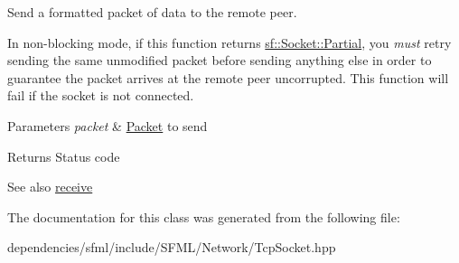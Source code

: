 Send a formatted packet of data to the remote peer. 

In non-\/blocking mode, if this function returns \hyperlink{classsf_1_1_socket_a51bf0fd51057b98a10fbb866246176dca181c163fad2eaea927185d127c392706}{sf\+::\+Socket\+::\+Partial}, you {\itshape must} retry sending the same unmodified packet before sending anything else in order to guarantee the packet arrives at the remote peer uncorrupted. This function will fail if the socket is not connected.


\begin{DoxyParams}{Parameters}
{\em packet} & \hyperlink{classsf_1_1_packet}{Packet} to send\\
\hline
\end{DoxyParams}
\begin{DoxyReturn}{Returns}
Status code
\end{DoxyReturn}
\begin{DoxySeeAlso}{See also}
\hyperlink{classsf_1_1_tcp_socket_a90ce50811ea61d4f00efc62bb99ae1af}{receive} 
\end{DoxySeeAlso}


The documentation for this class was generated from the following file\+:\begin{DoxyCompactItemize}
\item 
dependencies/sfml/include/\+S\+F\+M\+L/\+Network/Tcp\+Socket.\+hpp\end{DoxyCompactItemize}
